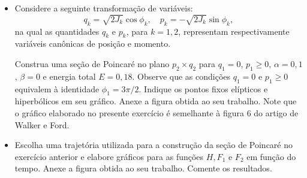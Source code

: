 \documentclass[a4paper]{article}
\begin{document}
\begin{center}
\begin{itemize}
\begin{lstlisting}[language=Python, caption={}, label={lst:}]
\end{lstlisting}
    \item[(2.4)] Considere a seguinte transformação de variáveis:
    \[
        q_k = \sqrt{2J_k} \cos \phi_k, \quad
        p_k = -\sqrt{2J_k} \sin \phi_k,
    \]
    na qual as quantidades \( q_k \) e \( p_k \), para \( k = 1,2 \), representam respectivamente variáveis canônicas de posição e momento.

    Construa uma seção de Poincaré no plano $p_2 \times q_2$ para $q_1 = 0$, $p_1 \geq 0$, 
$\alpha = 0{,}1$, $\beta = 0$ e energia total $E = 0{,}18$. Observe que as condições 
$q_1 = 0$ e $p_1 \geq 0$ equivalem à identidade $\phi_1 = 3\pi/2$. Indique os pontos 
fixos elípticos e hiperbólicos em seu gráfico. Anexe a figura obtida ao seu trabalho. 
Note que o gráfico elaborado no presente exercício é semelhante à figura 6 do artigo de 
Walker e Ford.
    \begin{answer}[Ítem 2.4]
    \end{answer}

    \item[(2.5)] Escolha uma trajetória utilizada para a construção da seção de Poincaré no exercício anterior e elabore gráficos para as funções \( H, F_1 \) e \( F_2 \) em função do tempo. Anexe a figura obtida ao seu trabalho. Comente os resultados.
    \begin{answer}[Ítem 2.5]
    \end{answer}


\end{itemize}
\end{center}
\end{document}
